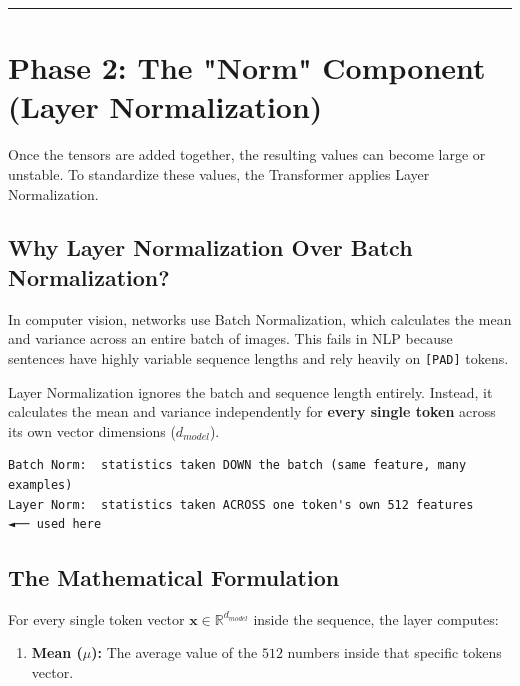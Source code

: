 \documentclass[11pt,a4paper,oneside]{report}
\providecommand{\tightlist}{\setlength{\itemsep}{0pt}\setlength{\parskip}{0pt}}
\begin{document}
\begin{center}\rule{0.5\linewidth}{0.5pt}\end{center}

\section{Phase 2: The "Norm" Component (Layer Normalization)}\label{phase-2-the-norm-component-layer-normalization}

Once the tensors are added together, the resulting values can become large or unstable. To standardize these values, the Transformer applies Layer Normalization.

\subsection{Why Layer Normalization Over Batch Normalization?}\label{why-layer-normalization-over-batch-normalization}

In computer vision, networks use Batch Normalization, which calculates the mean and variance across an entire batch of images. This fails in NLP because sentences have highly variable sequence lengths and rely heavily on \texttt{{[}PAD{]}} tokens.

Layer Normalization ignores the batch and sequence length entirely. Instead, it calculates the mean and variance independently for \textbf{every single token} across its own vector dimensions (\(d_{model}\)).

\begin{Verbatim}[fontsize=\small]
Batch Norm:  statistics taken DOWN the batch (same feature, many examples)
Layer Norm:  statistics taken ACROSS one token's own 512 features   ◄── used here
\end{Verbatim}

\subsection{The Mathematical Formulation}\label{the-mathematical-formulation}

For every single token vector \(\mathbf{x} \in \mathbb{R}^{d_{model}}\) inside the sequence, the layer computes:

\begin{enumerate}
\def\labelenumi{\arabic{enumi}.}
\tightlist
\item
  \textbf{Mean (\(\mu\)):} The average value of the \(512\) numbers inside that specific token\textquotesingle s vector.
\end{enumerate}
\end{document}
